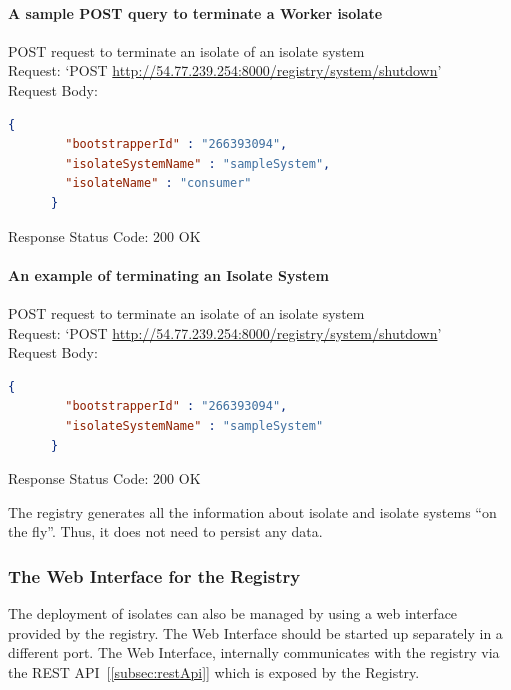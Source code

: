 \paragraph{A sample POST query to terminate a Worker isolate}
  \begin{description}
    \item{POST request to terminate an isolate of an isolate system}\\
    Request: ‘POST \url{http://54.77.239.254:8000/registry/system/shutdown}’\\
    Request Body:
    \begin{lstlisting}[language=json,firstnumber=1]
      {
        "bootstrapperId" : "266393094",
        "isolateSystemName" : "sampleSystem",
        "isolateName" : "consumer"
      }
    \end{lstlisting}
    Response Status Code: 200 OK
  \end{description}

\paragraph{An example of terminating an Isolate System}
  \begin{description}
    \item{POST request to terminate an isolate of an isolate system}\\
    Request: ‘POST \url{http://54.77.239.254:8000/registry/system/shutdown}’\\
    Request Body:
    \begin{lstlisting}[language=json,firstnumber=1]
      {
        "bootstrapperId" : "266393094",
        "isolateSystemName" : "sampleSystem"
      }
    \end{lstlisting}
    Response Status Code: 200 OK
  \end{description}

The registry generates all the information about isolate and isolate systems “on the fly”. Thus, it does not need to persist any data.

  \subsubsection{The Web Interface for the Registry}
  The deployment of isolates can also be managed by using a web interface provided by the registry. The Web Interface should be started up separately in a different port. The Web Interface, internally communicates with the registry via the REST API~[\ref{subsec:restApi}] which is exposed by the Registry.

